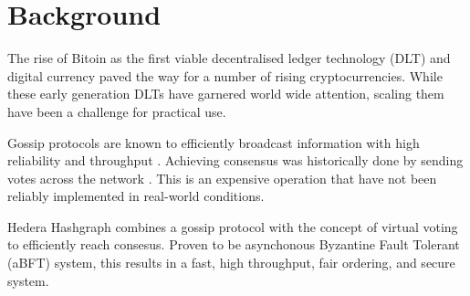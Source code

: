 \section{Background}

The rise of Bitoin as the first viable decentralised ledger technology (DLT) and digital currency paved the way for a number of rising cryptocurrencies. While these early generation DLTs have garnered world wide attention, scaling them have been a challenge for practical use. 


Gossip protocols are known to efficiently broadcast information with high reliability and throughput \cite{birman}. Achieving consensus was historically done by sending votes across the network \cite{berman1989towards}. This is an expensive operation that have not been reliably implemented in real-world conditions.

Hedera Hashgraph\cite{baird2016} combines a gossip protocol with the concept of virtual voting to efficiently reach consesus. Proven to be asynchonous Byzantine Fault Tolerant (aBFT) system, this results in a fast, high throughput, fair ordering, and secure system.
